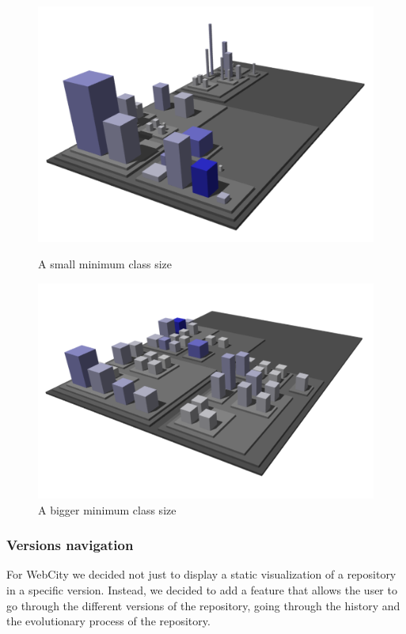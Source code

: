 \documentclass[]{usiinfbachelorproject}
\begin{document}
\begin{figure}[H]
  \centering
  \begin{minipage}[b]{0.49\textwidth}
      \includegraphics[width=1\textwidth]{pictures/small.png}
      \caption{A small minimum class size}
      \label{fig:sizes small}
  \end{minipage}
  \hfill
  \begin{minipage}[b]{0.49\textwidth}
    \includegraphics[width=1\textwidth]{pictures/big.png}
    \caption{A bigger minimum class size}
    \label{fig:sizes small}
  \end{minipage}
\end{figure}

\subsubsection{Versions navigation} \label{Version navigation}
For WebCity we decided not just to display a static visualization of a repository in a specific version. Instead, we
decided to add a feature that allows the user to go through the different versions of the repository, going through the history and the evolutionary process of the repository.
\end{document}
